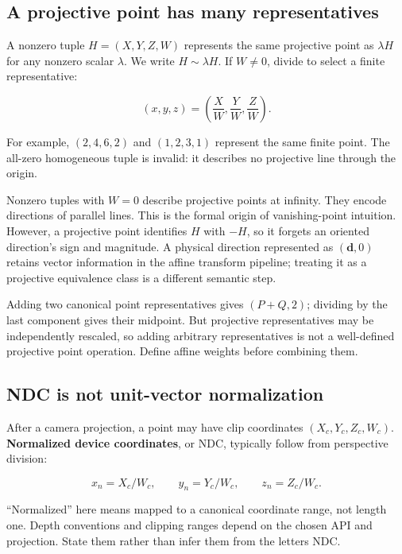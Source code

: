 \subsection{A projective point has many representatives}\label{01-foundations-i-ch018-a-projective-point-has-many-representatives}

A nonzero tuple \(H=(X,Y,Z,W)\) represents the same projective point as \(\lambda H\) for any nonzero scalar \(\lambda\). We write \(H\sim\lambda H\). If \(W\ne0\), divide to select a finite representative:

\[
(x,y,z)=\left(\frac XW,\frac YW,\frac ZW\right).
\]

For example, \((2,4,6,2)\) and \((1,2,3,1)\) represent the same finite point. The all-zero homogeneous tuple is invalid: it describes no projective line through the origin.

Nonzero tuples with \(W=0\) describe projective points at infinity. They encode directions of parallel lines. This is the formal origin of vanishing-point intuition. However, a projective point identifies \(H\) with \(-H\), so it forgets an oriented direction's sign and magnitude. A physical direction represented as \((\mathbf d,0)\) retains vector information in the affine transform pipeline; treating it as a projective equivalence class is a different semantic step.

Adding two canonical point representatives gives \((P+Q,2)\); dividing by the last component gives their midpoint. But projective representatives may be independently rescaled, so adding arbitrary representatives is not a well-defined projective point operation. Define affine weights before combining them.

\subsection{NDC is not unit-vector normalization}\label{01-foundations-i-ch018-ndc-is-not-unit-vector-normalization}

After a camera projection, a point may have clip coordinates \((X_c,Y_c,Z_c,W_c)\). \textbf{Normalized device coordinates}, or NDC, typically follow from perspective division:

\[
x_n=X_c/W_c,\qquad y_n=Y_c/W_c,\qquad z_n=Z_c/W_c.
\]

``Normalized'' here means mapped to a canonical coordinate range, not length one. Depth conventions and clipping ranges depend on the chosen API and projection. State them rather than infer them from the letters NDC.

